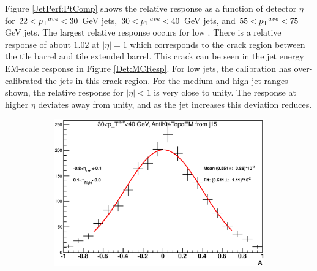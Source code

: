 Figure \ref{JetPerf:PtComp} shows the relative response as a function of detector $\eta$ for $22<\mbox{$\mbox{$p_{\rm T}$}{}^{ave}$}{}<30$ GeV jets, $30<\mbox{$\mbox{$p_{\rm T}$}{}^{ave}$}{}<40$ GeV jets, and $55<\mbox{$\mbox{$p_{\rm T}$}{}^{ave}$}{}<75$ GeV jets. 
The largest relative response occurs for low \ptave{}.
There is a relative response of about $1.02$ at $|\eta|=1$ which corresponds to the crack region between the tile barrel and tile extended barrel. 
This crack can be seen in the jet energy EM-scale response in Figure \ref{Det:MCResp}.
For low \pt{} jets, the calibration has over-calibrated the jets in this crack region. 
For the medium and high jet \pt{} ranges shown, the relative response for $|\eta|<1$ is very close to unity.
The response at higher $\eta{}$ deviates away from unity, and as the jet \pt{} increases this deviation reduces. 

\begin{figure}
\centering
        \begin{subfigure}[b]{0.8\textwidth}
                \centering
                \includegraphics[width=\textwidth]{figures/JetPerformance/2011/j15zvar4_6.eps}
        \end{subfigure}%


\end{figure}
